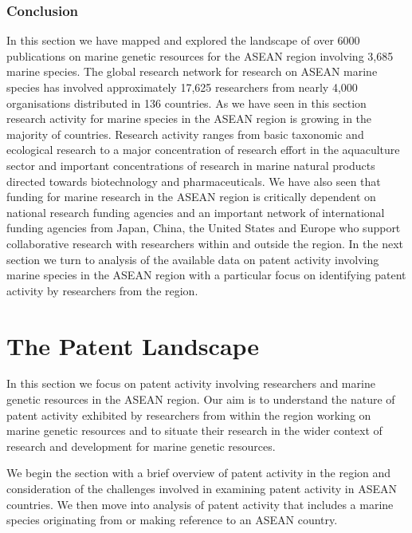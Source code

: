 \documentclass[]{book}
\theoremstyle{definition}
\theoremstyle{definition}
\theoremstyle{definition}
\theoremstyle{remark}
\begin{document}
\hypertarget{conclusion-1}{%
\subsection{Conclusion}\label{conclusion-1}}

In this section we have mapped and explored the landscape of over 6000
publications on marine genetic resources for the ASEAN region involving
3,685 marine species. The global research network for research on ASEAN
marine species has involved approximately 17,625 researchers from nearly
4,000 organisations distributed in 136 countries. As we have seen in
this section research activity for marine species in the ASEAN region is
growing in the majority of countries. Research activity ranges from
basic taxonomic and ecological research to a major concentration of
research effort in the aquaculture sector and important concentrations
of research in marine natural products directed towards biotechnology
and pharmaceuticals. We have also seen that funding for marine research
in the ASEAN region is critically dependent on national research funding
agencies and an important network of international funding agencies from
Japan, China, the United States and Europe who support collaborative
research with researchers within and outside the region. In the next
section we turn to analysis of the available data on patent activity
involving marine species in the ASEAN region with a particular focus on
identifying patent activity by researchers from the region.

\hypertarget{patent}{%
\chapter{The Patent Landscape}\label{patent}}

In this section we focus on patent activity involving researchers and
marine genetic resources in the ASEAN region. Our aim is to understand
the nature of patent activity exhibited by researchers from within the
region working on marine genetic resources and to situate their research
in the wider context of research and development for marine genetic
resources.

We begin the section with a brief overview of patent activity in the
region and consideration of the challenges involved in examining patent
activity in ASEAN countries. We then move into analysis of patent
activity that includes a marine species originating from or making
reference to an ASEAN country.
\end{document}
